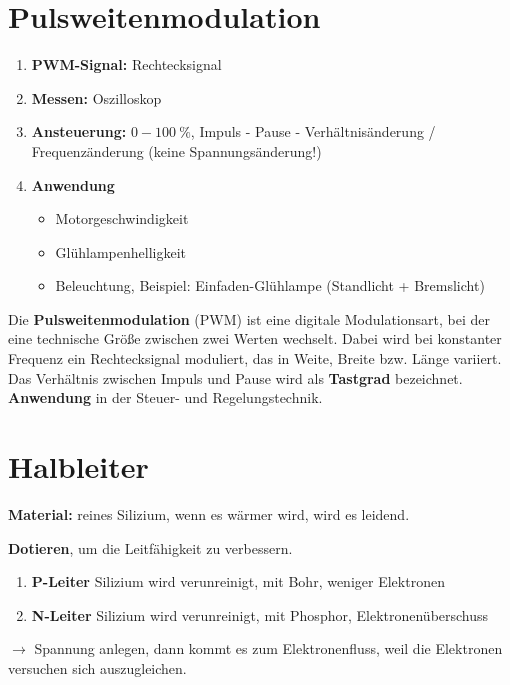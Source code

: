 \section{Pulsweitenmodulation}\label{pulsweitenmodulation}

\begin{enumerate}
\item
  \textbf{PWM-Signal:} Rechtecksignal
\item
  \textbf{Messen:} Oszilloskop
\item
  \textbf{Ansteuerung:} $0 - 100~\%$, Impuls - Pause -
  Verhältnisänderung / Frequenzänderung (keine Spannungsänderung!)
\item
  \textbf{Anwendung}

  \begin{itemize}
  \item
    Motorgeschwindigkeit
  \item
    Glühlampenhelligkeit
  \item
    Beleuchtung, Beispiel: Einfaden-Glühlampe (Standlicht + Bremslicht)
  \end{itemize}
\end{enumerate}

Die \textbf{Pulsweitenmodulation} (PWM) ist eine digitale
Modulationsart, bei der eine technische Größe zwischen zwei Werten
wechselt. Dabei wird bei konstanter Frequenz ein Rechtecksignal
moduliert, das in Weite, Breite bzw. Länge variiert. Das Verhältnis
zwischen Impuls und Pause wird als \textbf{Tastgrad} bezeichnet.
\textbf{Anwendung} in der Steuer- und Regelungstechnik.

\section{Halbleiter}\label{halbleiter}

\textbf{Material:} reines Silizium, wenn es wärmer wird, wird es
leidend.

\textbf{Dotieren}, um die Leitfähigkeit zu verbessern.

\begin{enumerate}
\item
  \textbf{P-Leiter} Silizium wird verunreinigt, mit Bohr, weniger
  Elektronen
\item
  \textbf{N-Leiter} Silizium wird verunreinigt, mit Phosphor,
  Elektronenüberschuss
\end{enumerate}

$\to$ Spannung anlegen, dann kommt es zum Elektronenfluss, weil die
Elektronen versuchen sich auszugleichen.

